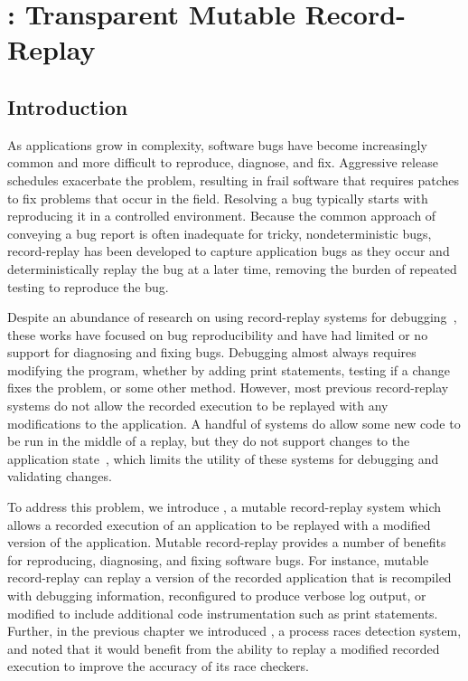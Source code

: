 \chapter{\dora: Transparent Mutable Record-Replay}
\label{ch:dora}

\section{Introduction}

As applications grow in complexity, software bugs have become
increasingly common and more difficult to reproduce, diagnose, and fix.
Aggressive release schedules
exacerbate the problem, resulting in frail software that requires patches to
fix problems that occur in the field. Resolving a bug typically starts with
reproducing it in a controlled environment. Because the common approach of conveying a bug
report is often inadequate for tricky, nondeterministic bugs, record-replay has been developed to
capture application bugs as they occur and
deterministically replay the bug at a later time, removing the burden of
repeated testing to reproduce the bug.

Despite an abundance of research on using record-replay systems for 
debugging~\cite{idna:vee06,instant-replay,r2:osdi,odr:sosp09,pinsel:pldi07,pres:sosp09,jockey,srinivasan:flashback,subhraveti:sigmetrics11}, these works have
focused on bug reproducibility and have had limited or no support for diagnosing
and fixing bugs.
Debugging almost always requires modifying the program, whether by
adding print statements, testing if a change fixes the problem, or
some other method.
However, most previous record-replay systems do not allow the recorded execution
to be replayed with any modifications to the application.
A handful of systems do allow some new code to be run in the middle of a replay,
but they do not support changes to the application
state~\cite{intrusions:sosp05,decouple:usenix08},
which limits the utility of these systems for debugging and validating changes.

To address this problem, we introduce {\dora}, a mutable
record-replay system which allows a recorded execution of an
application to be replayed with a modified version
of the application. Mutable record-replay provides a
number of benefits for reproducing, diagnosing, and fixing software
bugs. For instance, mutable record-replay can replay a version
of the recorded application that is recompiled with debugging information,
reconfigured to produce verbose log output, or modified to include additional
code instrumentation such as print statements.
Further, in the previous chapter we introduced \racepro, a process races
detection system, and noted that it would benefit from the ability to replay a
modified recorded execution to improve the accuracy of its race checkers.

